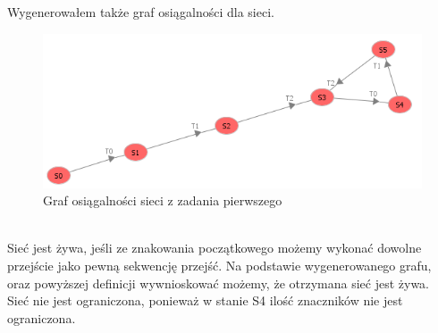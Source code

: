 \documentclass{article}
\begin{document}
        Wygenerowałem także graf osiągalności dla sieci.
        \begin{figure}[h!]
            \centering
            \includegraphics[width=14cm]{lab6/n1_2.png}
            \caption{Graf osiągalności sieci z zadania pierwszego}
        \end{figure}\\
        Sieć jest żywa, jeśli ze znakowania początkowego możemy wykonać dowolne przejście jako pewną sekwencję przejść. Na podstawie wygenerowanego grafu, oraz powyższej definicji wywnioskować możemy, że otrzymana sieć jest żywa. \\
        Sieć nie jest ograniczona, ponieważ w stanie S4 ilość znaczników nie jest ograniczona.
\end{document}
